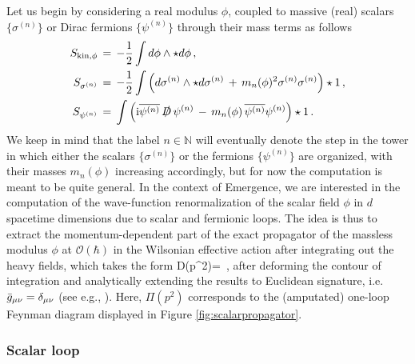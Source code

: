 Let us begin by considering a real modulus $\phi$, coupled to massive (real) scalars $\{\sigma^{(n)}\}$ or Dirac fermions $\{\psi^{(n)}\}$ through their mass terms as follows
%
\begin{align}
			S_{\mathrm{kin,} \phi}\, &=\, -\dfrac{1}{2} \int   d\phi \wedge \star d\phi \, , \label{eq:Skinphi} \\
			S_{\sigma^{(n)}} \, &=\,  - \dfrac{1}{2} \int   \left( d\sigma^{(n)} \wedge \star d\sigma^{(n)}\,  +\,  m_n(\phi)^2 \sigma^{(n)} \sigma^{(n)} \right) \star 1\, , \label{eq:Ssigman}\\
			S_{\psi^{(n)}} \, &= \,  \int  \left( \text{i} \overline{\psi^{(n)}}\,  \slashed{D} \, \psi^{(n)} \, -\,  m_n(\phi) \, \overline{\psi^{(n)}}\psi^{(n)} \right) \star 1\, . \label{eq:Spsin}
\end{align}
%
We keep in mind that the label $n \in \mathbb{N}$ will eventually denote the step in the tower in which either the scalars $\{\sigma^{(n)}\}$ or the fermions $\{\psi^{(n)}\}$ are organized, with their masses $m_n(\phi)$ increasing accordingly, but for now the computation is meant to be quite general. In the context of Emergence, we are interested in the computation of the wave-function renormalization of the scalar field $\phi$ in $d$ spacetime dimensions due to scalar and fermionic loops. The idea is thus to extract the momentum-dependent part of the exact propagator of the massless modulus $\phi$ at $\mathcal{O}(\hbar)$ in the Wilsonian effective action after integrating out the heavy fields, which takes the form
%
\beq\label{eq:exactpropscalar}
		D(p^2)=\, ,
\eeq
%
after deforming the contour of integration and analytically extending the results to Euclidean signature, i.e. $\Bar{g}_{\mu \nu}= \delta_{\mu \nu}$ (see e.g., \cite{Nair:2005iw}). Here, $\Pi(p^2)$ corresponds to the (amputated) one-loop Feynman diagram displayed in Figure \ref{fig:scalarpropagator}.
		
\subsubsection*{Scalar loop}
		

